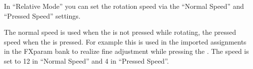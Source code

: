 In ``Relative Mode'' you can set the rotation speed via the ``Normal Speed''
and ``Pressed Speed'' settings.

\clearpage
 
The normal speed is used when the \vpot is not
pressed while rotating, the pressed speed when the \vpot is
pressed. For example this is
used in the imported assignments in the FXparam bank to realize fine adjustment
while pressing the \vpots. The speed is set to 12 in ``Normal Speed'' and 4 in
``Pressed Speed''.


